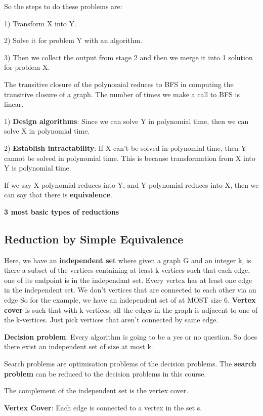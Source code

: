 \documentclass[11pt, oneside]{article}
\theoremstyle{definition}
\begin{document}
So the steps to do these problems are:
\begin{center}
  1) Transform X into Y.

  2) Solve it for problem Y with an algorithm.

  3) Then we collect the output from stage 2 and then we merge it into 1 solution for problem X.
\end{center}

The transitive closure of the polynomial reduces to BFS in computing the transitive closure of a graph. The number of times we make a call to BFS is linear.

1) \textbf{Design algorithms}: Since we can solve Y in polynomial time, then we can solve X in polynomial time.

2) \textbf{Establish intractability}: If X can't be solved in polynomial time, then Y cannot be solved in polynomial time. This is because transformation from X into Y is polynomial time.

If we say X polynomial reduces into Y, and Y polynomial reduces into X, then we can say that there is \textbf{equivalence}.

\textbf{3 most basic types of reductions}

\subsection{Reduction by Simple Equivalence}
Here, we have an \textbf{independent set} where given a graph G and an integer k, is there a subset of the vertices containing at least k vertices such that each edge, one of its endpoint is in the independant set. Every vertex has at least one edge in the independent set. We don't vertices that are connected to each other via an edge So for the example, we have an independent set of at MOST size 6. \textbf{Vertex cover} is such that with k vertices, all the edges in the graph is adjacent to one of the k-vertices. Just pick vertices that aren't connected by same edge.

\textbf{Decision problem}: Every algorithm is going to be a yes or no question. So does there exist an independent set of size at most k.

Search problems are optimisation problems of the decision problems. The \textbf{search problem} can be reduced to the decision problems in this course.

The complement of the independent set is the vertex cover.

\textbf{Vertex Cover}: Each edge is connected to a vertex in the set s.
\end{document}
